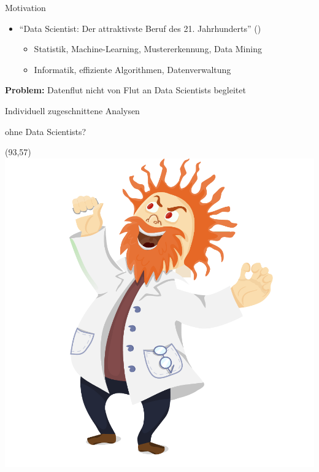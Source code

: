 \documentclass{beamer}
\newcommand{\scite}[1]{ {\scriptsize \textcolor{cgray}{(\cite{#1})}} }
\begin{document}
\begin{frame}[t]{Motivation}
\begin{itemize}
\vspace*{1em}
\item \enquote{Data Scientist: Der attraktivste Beruf des 21. Jahrhunderts} \scite{davenport2012data}
	\begin{itemize}
	\item Statistik, Machine-Learning, Mustererkennung, Data Mining
	\item Informatik, effiziente Algorithmen, Datenverwaltung
	\end{itemize}
\end{itemize}

\vspace*{1em}
\textbf{Problem:} Datenflut nicht von Flut an Data Scientists begleitet

\vspace*{3em}
\begin{center}
{\Large Individuell zugeschnittene Analysen}\hspace*{4em}

{\Large ohne Data Scientists?}\hspace*{4em}
\end{center}

\begin{textblock}{30}(93,57)
	\includegraphics[width=1\linewidth]{scientist}
\end{textblock}
\end{frame}
\end{document}
